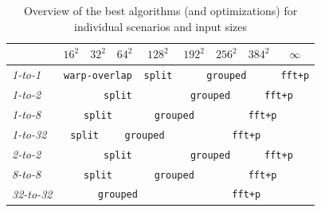 \begin{table}
	\begin{tabular}{l|cccccccc}\toprule
		             & $16^2$                                     & $32^2$                                & $64^2$                                & $128^2$         & $192^2$                     & $256^2$ & $384^2$ & $\infty$ \\\midrule
		\emph{1-to-1}   & \multicolumn{3}{c|}{\texttt{warp-overlap}} & \multicolumn{1}{c|}{\texttt{split}}   & \multicolumn{3}{c|}{\texttt{grouped}} & \multicolumn{1}{r}{\texttt{fft+p}}                                \\\bottomrule
		\emph{1-to-2}   & \multicolumn{4}{c|}{\texttt{split}}        & \multicolumn{2}{c|}{\texttt{grouped}} & \multicolumn{2}{c}{\texttt{fft+p}}                                                                        \\
		\emph{1-to-8}   & \multicolumn{3}{c|}{\texttt{split}}        & \multicolumn{2}{c|}{\texttt{grouped}} & \multicolumn{3}{c}{\texttt{fft+p}}                                                                        \\
		\emph{1-to-32}  & \multicolumn{2}{c|}{\texttt{split}}        & \multicolumn{2}{c|}{\texttt{grouped}} & \multicolumn{4}{c}{\texttt{fft+p}}                                                                        \\\bottomrule
		\emph{2-to-2}   & \multicolumn{4}{c|}{\texttt{split}}        & \multicolumn{2}{c|}{\texttt{grouped}} & \multicolumn{2}{c}{\texttt{fft+p}}                                                                        \\
		\emph{8-to-8}   & \multicolumn{3}{c|}{\texttt{split}}        & \multicolumn{2}{c|}{\texttt{grouped}} & \multicolumn{3}{c}{\texttt{fft+p}}                                                                        \\
		\emph{32-to-32} & \multicolumn{4}{c|}{\texttt{grouped}}      & \multicolumn{4}{c}{\texttt{fft+p}}                                                                                                                \\\bottomrule
	\end{tabular}
	\centering
	\caption{Overview of the best algorithms (and optimizations) for individual scenarios and input sizes}
	\label{tab:overview-all}
\end{table}
